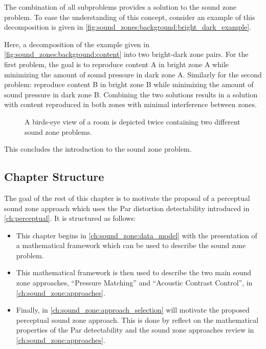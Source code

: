 The combination of all subproblems provides a solution to the sound zone problem. 
To ease the understanding of this concept, consider an example of this decomposition is given in 
\autoref{fig:sound_zones:background:bright_dark_example}.

Here, a decomposition of the example given in \autoref{fig:sound_zones:background:content} into 
two bright-dark zone pairs.
For the first problem, the goal is to reproduce content A in bright zone A while minimizing 
the amount of sound pressure in dark zone A.
Similarly for the second problem: reproduce content B in bright zone B while minimizing the 
amount of sound pressure in dark zone B.
Combining the two solutions results in a solution with content reproduced in both zones with 
minimal interference between zones.

\begin{figure}[]
    \centering
    \begin{subfigure}{0.49\linewidth}
        \centering
        \scalebox{0.9}{}
    \end{subfigure}
    \begin{subfigure}{0.49\linewidth}
        \centering
        \scalebox{0.9}{}
    \end{subfigure}
    \caption{A birds-eye view of a room is depicted twice containing two different sound zone problems.}
    \label{fig:sound_zones:background:bright_dark_example}
\end{figure}

This concludes the introduction to the sound zone problem.

\subsection*{Chapter Structure}
The goal of the rest of this chapter is to motivate the proposal of a perceptual sound zone approach which uses
the Par distortion detectability introduced in \autoref{ch:perceptual}.
It is structured as follows:
\begin{itemize}
    \item This chapter begins in \autoref{ch:sound_zone:data_model} with the presentation of  
a mathematical framework which can be used to describe the sound zone problem.
    \item This mathematical framework is then used to describe the two main sound zone approaches, ``Pressure Matching'' and ``Acoustic Contrast Control'', 
in \autoref{ch:sound_zone:approaches}.
    \item Finally, in \autoref{ch:sound_zone:approach_selection} will motivate the proposed perceptual sound zone approach.
This is done by reflect on the mathematical properties of the Par detectability and the sound zone approaches review in \autoref{ch:sound_zone:approaches}.
\end{itemize}
